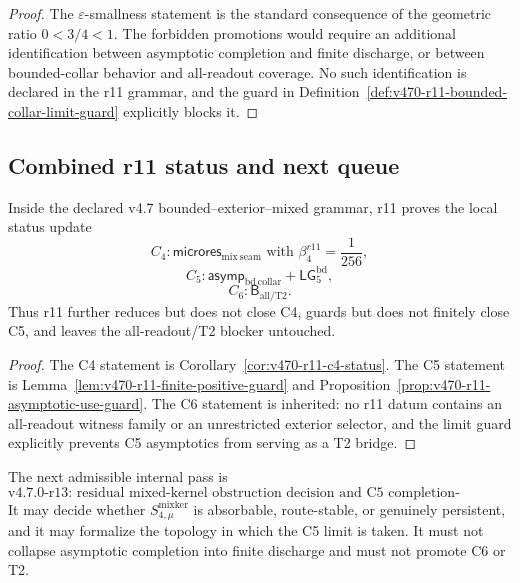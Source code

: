 \begin{proof}
The \(\varepsilon\)-smallness statement is the standard consequence of the
geometric ratio \(0<3/4<1\).  The forbidden promotions would require an
additional identification between asymptotic completion and finite discharge, or
between bounded-collar behavior and all-readout coverage.  No such identification
is declared in the r11 grammar, and the guard in Definition~\ref{def:v470-r11-bounded-collar-limit-guard}
explicitly blocks it.
\end{proof}

\subsection{Combined r11 status and next queue}
\label{subsec:v470-r11-combined-status}

\begin{theorem}
\label{thm:v470-r11-microsplit-limit-guard-theorem}
Inside the declared v4.7 bounded--exterior--mixed grammar, r11 proves the local
status update
\[
C_4:\mathsf{microres}_{\mathrm{mix\ seam}}
\text{ with }\beta_4^{r11}=\frac1{256},
\]
\[
C_5:\mathsf{asymp}_{\mathrm{bd\ collar}}+\mathsf{LG}_5^{\mathrm{bd}},
\]
\[
C_6:\mathsf B_{\mathrm{all/T2}}.
\]
Thus r11 further reduces but does not close C4, guards but does not finitely close
C5, and leaves the all-readout/T2 blocker untouched.
\end{theorem}

\begin{proof}
The C4 statement is Corollary~\ref{cor:v470-r11-c4-status}.  The C5 statement is
Lemma~\ref{lem:v470-r11-finite-positive-guard} and Proposition~\ref{prop:v470-r11-asymptotic-use-guard}.
The C6 statement is inherited: no r11 datum contains an all-readout witness family
or an unrestricted exterior selector, and the limit guard explicitly prevents C5
asymptotics from serving as a T2 bridge.
\end{proof}

\begin{corollary}
\label{cor:v470-r11-permitted-r12-direction}
The next admissible internal pass is
\[
\text{v4.7.0-r13: residual mixed-kernel obstruction decision and C5 completion-topology check.}
\]
It may decide whether \(S_{4,\mu}^{\mathrm{mixker}}\) is absorbable, route-stable,
or genuinely persistent, and it may formalize the topology in which the C5 limit
is taken.  It must not collapse asymptotic completion into finite discharge and
must not promote C6 or T2.
\end{corollary}

